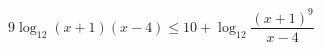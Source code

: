 \begin{ex}[type=inequality]
	\begin{condition}
		\( 9\log_{12}(x+1)(x-4)\le10+\log_{12}\dfrac{(x+1)^9}{x-4} \)
	\end{condition}
	\answer{\( [-8;-1)\cup(4;16] \)}
\end{ex}